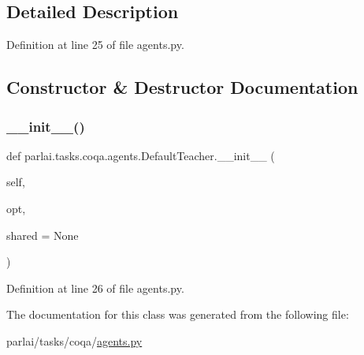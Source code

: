 \subsection{Detailed Description}


Definition at line 25 of file agents.\+py.



\subsection{Constructor \& Destructor Documentation}
\mbox{\label{classparlai_1_1tasks_1_1coqa_1_1agents_1_1DefaultTeacher_a62b634fe9152617c94604f39ff7851a1}} 
\subsubsection{\texorpdfstring{\+\_\+\+\_\+init\+\_\+\+\_\+()}{\_\_init\_\_()}}
{\footnotesize\ttfamily def parlai.\+tasks.\+coqa.\+agents.\+Default\+Teacher.\+\_\+\+\_\+init\+\_\+\+\_\+ (\begin{DoxyParamCaption}\item[{}]{self,  }\item[{}]{opt,  }\item[{}]{shared = {\ttfamily None} }\end{DoxyParamCaption})}



Definition at line 26 of file agents.\+py.



The documentation for this class was generated from the following file\+:\begin{DoxyCompactItemize}
\item 
parlai/tasks/coqa/\hyperlink{parlai_2tasks_2coqa_2agents_8py}{agents.\+py}\end{DoxyCompactItemize}
